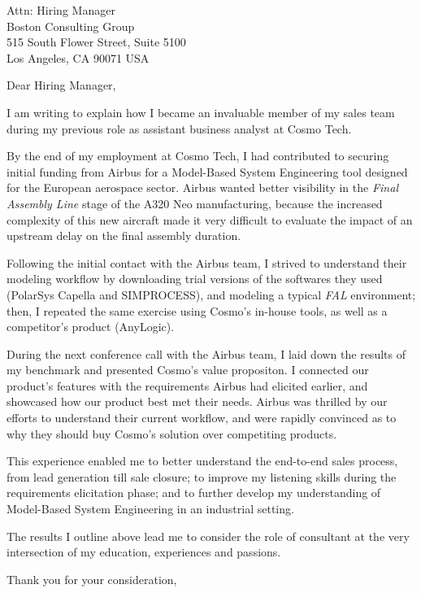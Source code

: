 \documentclass{letter}
\begin{document}
\signature{Marius Peter}
\longindentation=0pt
\address{Marius Peter\\
  519 Landfair Ave\\
  Los Angeles CA 90024
}


\begin{letter}{Attn: Hiring Manager\\
    Boston Consulting Group\\
    515 South Flower Street, Suite 5100\\
    Los Angeles, CA 90071 USA
  }

  \opening{\vfill Dear Hiring Manager,}

  I am writing to explain how I became an invaluable member of my sales team during my previous role as assistant business analyst at Cosmo Tech.

  By the end of my employment at Cosmo Tech, I had contributed to securing initial funding from Airbus for a Model-Based System Engineering tool designed for the European aerospace sector.
  Airbus wanted better visibility in the \textit{Final Assembly Line} stage of the A320 Neo manufacturing, because the increased complexity of this new aircraft made it very difficult to evaluate the impact of an upstream delay on the final assembly duration.

  Following the initial contact with the Airbus team, I strived to understand their modeling workflow by downloading trial versions of the softwares they used (PolarSys Capella and SIMPROCESS), and modeling a typical \textit{FAL} environment;
  then, I repeated the same exercise using Cosmo's in-house tools, as well as a competitor's product (AnyLogic).

  During the next conference call with the Airbus team, I laid down the results of my benchmark and presented Cosmo's value propositon.
  I connected our product's features with the requirements Airbus had elicited earlier, and showcased how our product best met their needs.
  Airbus was thrilled by our efforts to understand their current workflow, and were rapidly convinced as to why they should buy Cosmo's solution over competiting products.

  This experience enabled me to better understand the end-to-end sales process, from lead generation till sale closure;
  to improve my listening skills during the requirements elicitation phase;
  and to further develop my understanding of Model-Based System Engineering in an industrial setting. 

  The results I outline above lead me to consider the role of consultant at the very intersection of my education, experiences and passions.

  \closing{Thank you for your consideration,}

\end{letter}
\end{document}
